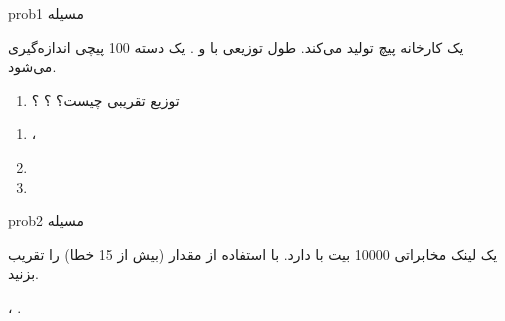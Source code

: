 \begin{PSbox}[unbreakable]{prob}{مسیله 1}

یک کارخانه پیچ تولید می‌کند. طول  توزیعی با \lr{\ensuremath{\mu} = 10cm} و \lr{\ensuremath{\sigma} = 0.2cm}. یک دسته 100 پیچی اندازه‌گیری می‌شود.

\begin{enumerate}
\def\labelenumi{(\alph{enumi})}
\tightlist
\item
  توزیع تقریبی  چیست؟ ؟ ؟
\end{enumerate}

\PSsolution{} 

\begin{enumerate}
\def\labelenumi{(\alph{enumi})}
\tightlist
\item
  ، 
\item
\item
\end{enumerate}

\end{PSbox}

\begin{PSbox}[unbreakable]{prob}{مسیله 2}

یک لینک مخابراتی 10000 بیت با  دارد. با استفاده از  مقدار (بیش از 15 خطا) را تقریب بزنید.

\PSsolution{} ، .\PSbr{}

\end{PSbox}


